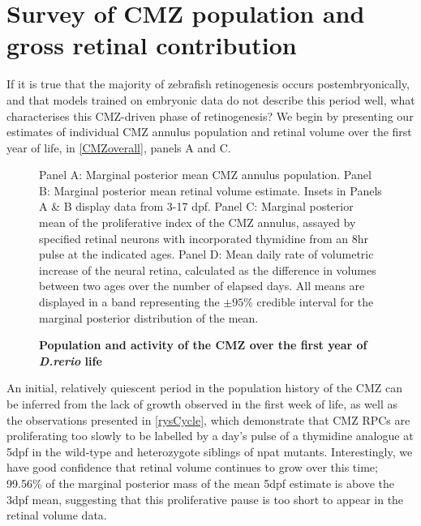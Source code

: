 \section{Survey of CMZ population and gross retinal contribution}

If it is true that the majority of zebrafish retinogenesis occurs postembryonically, and that models trained on embryonic data do not describe this period well, what characterises this CMZ-driven phase of retinogenesis? We begin by presenting our estimates of individual CMZ annulus population and retinal volume over the first year of life, in \autoref{CMZoverall}, panels A and C.

\begin{figure}[!h]
    \caption{{\bf Population and activity of the CMZ over the first year of \textit{D.rerio} life}}
    Panel A: Marginal posterior mean CMZ annulus population. Panel B: Marginal posterior mean retinal volume estimate. Insets in Panels A \& B display data from 3-17 dpf. Panel C: Marginal posterior mean of the proliferative index of the CMZ annulus, assayed by specified retinal neurons with incorporated thymidine from an 8hr pulse at the indicated ages. Panel D: Mean daily rate of volumetric increase of the neural retina, calculated as the difference in volumes between two ages over the number of elapsed days. All means are displayed in a band representing the $\pm 95 \%$ credible interval for the marginal posterior distribution of the mean.
    \label{CMZoverall}
\end{figure}

An initial, relatively quiescent period in the population history of the CMZ can be inferred from the lack of growth observed in the first week of life, as well as the observations presented in \autoref{rysCycle}, which demonstrate that CMZ RPCs are proliferating too slowly to be labelled by a day's pulse of a thymidine analogue at 5dpf in the wild-type and heterozygote siblings of npat mutants. Interestingly, we have good confidence that retinal volume continues to grow over this time; 99.56\% of the marginal posterior mass of the mean 5dpf estimate is above the 3dpf mean, suggesting that this proliferative pause is too short to appear in the retinal volume data.

